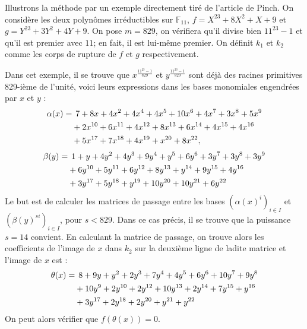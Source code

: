 \documentclass[a4paper]{article} %
\numberwithin{section}{part}
\numberwithin{equation}{section}
\newcommand\GF[1]{\mathbb{F}_{#1}}
\begin{document}
\begin{ex}
Illustrons la méthode par un exemple directement tiré de l'article de 
Pinch\cite{Pin}. On considère les deux polynômes irréductibles sur $\GF{11}$, 
$f = X^{23} + 8X^2 + X + 9$ et $g = Y^{23} + 3Y^2 + 4Y + 9$. On pose $m = 829$, 
on vérifiera qu'il divise bien $11^{23} - 1$ et qu'il est premier avec $11$; 
en fait, il est lui-même premier. On définit $k_1$ et $k_2$ comme les corps de 
rupture de $f$ et $g$ respectivement.\par
Dans cet exemple, il se trouve que $x^{\tfrac{11^{23} - 1}{829}}$ et 
$y^{\tfrac{11^{23} - 1}{829}}$ sont déjà des racines primitives 829-ième de 
l'unité, voici leurs expressions dans les bases monomiales engendrées par $x$ et
$y$ :
\begin{align*}
\alpha(x) =&\hspace{0.15cm} 7 + 8x + 4x^2 + 4x^4 + 4x^5 + 10x^6 + 4x^7 + 3x^8 + 
5x^9\\
& + 2x^{10} + 6x^{11} + 4x^{12} + 8x^{13} + 6x^{14} + 4x^{15} + 4x^{16}\\
& + 5x^{17}  + 7x^{18} + 4x^{19} + x^{20} + 8x^{22},
\end{align*}
\begin{align*}
\beta(y) =&\hspace{0.15cm}1 + y + 4y^2 + 4y^3 + 9y^4 + y^5 + 6y^6 + 3y^7 + 3y^8 
+ 3y^9\\
& + 6y^{10} + 5y^{11} + 6y^{12} + 8y^{13} + y^{14} + 9y^{15} + 4y^{16}\\
& + 3y^{17} + 5y^{18} + y^{19} + 10y^{20} + 10y^{21} + 6y^{22}
\end{align*}
Le but est de calculer les matrices de passage entre les bases
$(\alpha(x)^i)_{i\in I}$ et $(\beta(y)^{si})_{i\in I}$, pour $s < 829$.
Dans ce cas précis, il se trouve que la puissance $s = 14$ convient. En 
calculant la matrice de passage, on trouve alors les coefficients de l'image de 
$x$ dans $k_2$ sur la deuxième ligne de ladite matrice et l'image de $x$ est :
\begin{align*}
\theta(x) =&\hspace{0.15cm} 8 + 9y + y^2 + 2y^3 + 7y^4 + 4y^5 + 6y^6 + 10y^7 + 
9y^8\\
& + 10y^9 + 2y^{10} + 2y^{12} + 10y^{13} + 2y^{14} + 7y^{15} + y^{16}\\
& + 3y^{17} + 2y^{18} + 2y^{20} + y^{21} + y^{22}
\end{align*}
On peut alors vérifier que $f(\theta(x)) = 0$.
\end{ex}
\end{document}

